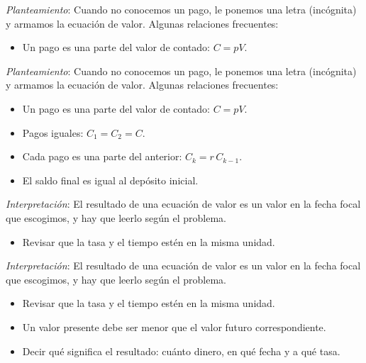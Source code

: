 \documentclass{beamer}
\begin{document}
  \begin{frame}
    \textit{Planteamiento}: Cuando no conocemos un pago, le ponemos una letra
    (incógnita) y armamos la ecuación de valor. Algunas relaciones frecuentes:

    \begin{itemize}
      \item Un pago es una parte del valor de contado: $C = pV$.
    \end{itemize}
  \end{frame}

  \begin{frame}
    \textit{Planteamiento}: Cuando no conocemos un pago, le ponemos una letra
    (incógnita) y armamos la ecuación de valor. Algunas relaciones frecuentes:

    \begin{itemize}
      \item Un pago es una parte del valor de contado: $C = pV$.
      \item Pagos iguales: $C_1 = C_2 = C$.
      \item Cada pago es una parte del anterior: $C_k = r\,C_{k-1}$.
      \item El saldo final es igual al depósito inicial.
    \end{itemize}
  \end{frame}

  \begin{frame}
    \textit{Interpretación}: El resultado de una ecuación de valor es un valor
    en la fecha focal que escogimos, y hay que leerlo según el problema.

    \begin{itemize}
      \item Revisar que la tasa y el tiempo estén en la misma unidad.
    \end{itemize}
  \end{frame}

  \begin{frame}
    \textit{Interpretación}: El resultado de una ecuación de valor es un valor
    en la fecha focal que escogimos, y hay que leerlo según el problema.

    \begin{itemize}
      \item Revisar que la tasa y el tiempo estén en la misma unidad.
      \item Un valor presente debe ser menor que el valor futuro
      correspondiente.
      \item Decir qué significa el resultado: cuánto dinero, en qué fecha y a
      qué tasa.
    \end{itemize}
  \end{frame}
\end{document}
